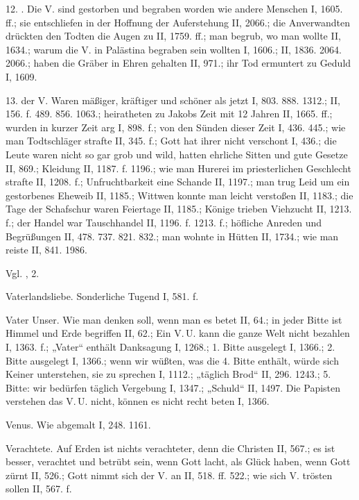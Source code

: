 12. . Die V. sind gestorben und begraben worden wie andere Menschen I, 1605. ff.; sie entschliefen in der Hoffnung der Auferstehung II, 2066.; die Anverwandten drückten den Todten die Augen zu II, 1759. ff.; man begrub, wo man wollte II, 1634.; warum die V. in Palästina begraben sein wollten I, 1606.; II, 1836. 2064. 2066.; haben die Gräber in Ehren gehalten II, 971.; ihr Tod ermuntert zu Geduld I, 1609.

13.  der V. Waren mäßiger, kräftiger und schöner als jetzt I, 803. 888. 1312.; II, 156. f. 489. 856. 1063.; heiratheten zu Jakobs Zeit mit 12 Jahren II, 1665. ff.; wurden in kurzer Zeit arg I, 898. f.; von den Sünden dieser Zeit I, 436. 445.; wie man Todtschläger strafte II, 345. f.; Gott hat ihrer nicht verschont I, 436.; die Leute waren nicht so gar grob und wild, hatten ehrliche Sitten und gute Gesetze II, 869.; Kleidung II, 1187. f. 1196.; wie man Hurerei im priesterlichen Geschlecht strafte II, 1208. f.; Unfruchtbarkeit eine Schande II, 1197.; man trug Leid um ein gestorbenes Eheweib II, 1185.; Wittwen konnte man leicht verstoßen II, 1183.; die Tage der Schafschur waren Feiertage II, 1185.; Könige trieben Viehzucht II, 1213. f.; der Handel war Tauschhandel II, 1196. f. 1213. f.; höfliche Anreden und Begrüßungen II, 478. 737. 821. 832.; man wohnte in Hütten II, 1734.; wie man reiste II, 841. 1986.

Vgl. ,  2.

Vaterlandsliebe. Sonderliche Tugend I, 581. f.

Vater Unser. Wie man denken soll, wenn man es betet II, 64.; in jeder Bitte ist Himmel und Erde begriffen II, 62.; Ein V.\,U. kann die ganze Welt nicht bezahlen I, 1363. f.; „Vater“ enthält Danksagung I, 1268.; 1. Bitte ausgelegt I, 1366.; 2. Bitte ausgelegt I, 1366.; wenn wir wüßten, was die 4. Bitte enthält, würde sich Keiner unterstehen, sie zu sprechen I, 1112.; „täglich Brod“ II, 296. 1243.; 5. Bitte: wir bedürfen täglich Vergebung I, 1347.; „Schuld“ II, 1497. Die Papisten verstehen das V.\,U. nicht, können es nicht recht beten I, 1366.

Venus. Wie abgemalt I, 248. 1161.

Verachtete. Auf Erden ist nichts verachteter, denn die Christen II, 567.; es ist besser, verachtet und betrübt sein, wenn Gott lacht, als Glück haben, wenn Gott zürnt II, 526.; Gott nimmt sich der V. an II, 518. ff. 522.; wie sich V. trösten sollen II, 567. f.

